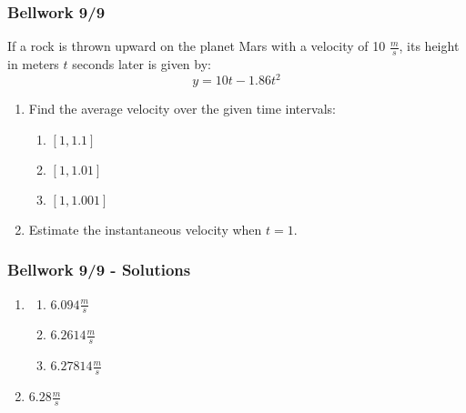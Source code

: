\documentclass[12pt]{beamer}
\begin{document}
\begin{frame}
	\frametitle{Bellwork 9/9}
	\vspace*{\fill}
	\vspace*{\fill}
	\initclock
	If a rock is thrown upward on the planet Mars with a velocity of 10 $\tfrac{m}{s}$, its height in meters $t$ seconds later is given by: \[y=10t-1.86t^2\]
	\vspace*{\fill}
	\begin{enumerate}
		\item Find the average velocity over the given time intervals:
		      \begin{multicols}{3}
			      \begin{enumerate}
				      \item $[1, 1.1]$
				      \item $[1, 1.01]$
				      \item $[1, 1.001]$
			      \end{enumerate}
		      \end{multicols}
		      \vspace*{\fill}
		\item Estimate the instantaneous velocity when $t=1$.
	\end{enumerate}
	\vspace*{\fill}
	\vspace*{\fill}
	\vspace*{\fill}
	\vspace*{\fill}
	\crono
\end{frame}
\begin{frame}
	\frametitle{Bellwork 9/9 - Solutions}
	\vspace*{\fill}
	\vspace*{\fill}
	\begin{enumerate}
		\item
		      \begin{multicols}{3}
			      \begin{enumerate}
				      \item $6.094\tfrac{m}{s}$
				      \item $6.2614\tfrac{m}{s}$
				      \item $6.27814\tfrac{m}{s}$
			      \end{enumerate}
		      \end{multicols}
		      \vspace*{\fill}
		\item $6.28\tfrac{m}{s}$
	\end{enumerate}
	\vspace*{\fill}
	\vspace*{\fill}
	\vspace*{\fill}
	\vspace*{\fill}
\end{frame}
\end{document}
